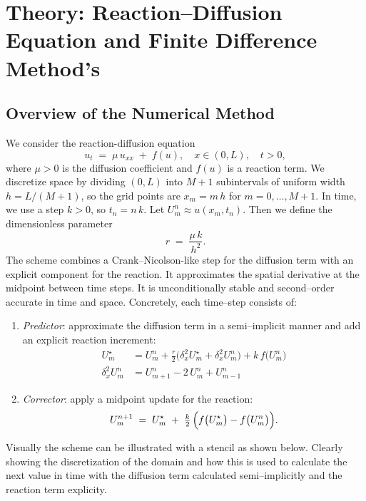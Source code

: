 \section{Theory: Reaction--Diffusion Equation and Finite Difference Method's}
\subsection{Overview of the Numerical Method}
We consider the reaction-diffusion equation
\[
  u_t \;=\; \mu\,u_{xx} \;+\; f(u),
  \quad x \in (0,L),\quad t>0,
\]
where \(\mu > 0\) is the diffusion coefficient and \(f(u)\) is a reaction term. We discretize
space by dividing \((0,L)\) into \(M+1\) subintervals of uniform width \(h = L/(M+1)\), so
the grid points are \(x_m = m\,h\) for \(m = 0,\dots,M+1\). In time, we use a step \(k>0\),
so \(t_n = n\,k\). Let \(U_m^n \approx u(x_m,t_n)\). Then we define the dimensionless
parameter
\[
  r \;=\; \frac{\mu\,k}{h^2}.
\]
The scheme combines a Crank--Nicolson-like step for the diffusion term with an explicit
component for the reaction. It approximates the spatial derivative at the midpoint between time steps.
It is unconditionally stable and second--order accurate in time and space. Concretely, each time--step consists of:

\begin{enumerate}
  \item \emph{Predictor}: approximate the diffusion term in a semi--implicit manner and
        add an explicit reaction increment:
        \begin{align*}
          U_m^\star        & = U_m^n + \frac{r}{2}\bigl(\delta_x^2 U_m^\star + \delta_x^2 U_m^n\bigr) + k\,f\bigl(U_m^n\bigr) \\
          \delta_x^2 U_m^n & = U_{m+1}^n - 2\,U_m^n + U_{m-1}^n \tag{Central Difference Method} \label{eq:cdm}
        \end{align*}
  \item \emph{Corrector}: apply a midpoint update for the reaction:
        \[
          U_m^{n+1}
          \;=\; U_m^\star
          \;+\; \tfrac{k}{2}\,\Bigl(f\bigl(U_m^\star\bigr) - f\bigl(U_m^n\bigr)\Bigr).
        \]
\end{enumerate}
Visually the scheme can be illustrated with a stencil as shown below.
Clearly showing the discretization of the domain and how this is used to calculate the next value in time with the diffusion term calculated semi--implicitly and the reaction term explicity.

